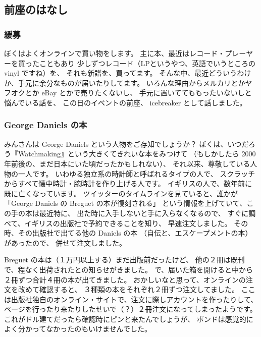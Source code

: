 \documentclass[dvipdfmx,autodetect-engine,10pt,b5paper,papersize,openany,dvipsnames]{jsbook}
\begin{document}
\begin{multicols}{2}
\subsection*{前座のはなし}

\subsubsection*{緩募}
ぼくはよくオンラインで買い物をします。
主に本、最近はレコード・プレーヤーを買ったこともあり
少しずつレコード（LPというやつ、英語でいうところの vinyl ですね）を、
それも新譜を、買ってます。
そんな中、最近どういうわけか、手元に余分なものが届いたりしてます。
いろんな理由からメルカリとかヤフオクとか eBay とかで売りたくないし、
手元に置いててももったいないしと悩んでいる話を、
この日のイベントの前座、 icebreaker として話しました。

\subsubsection*{George Daniels の本}

みんさんは George Daniels という人物をご存知でしょうか？
ぼくは、いつだろう『Watchmaking』という大きくてきれいな本をみつけて
（もしかしたら 2000年前後の、まだ日本にいた頃だったかもしれない）、
それ以来、尊敬している人物の一人です。
いわゆる独立系の時計師と呼ばれるタイプの人で、
スクラッチからすべて懐中時計・腕時計を作り上げる人です。
イギリスの人で、数年前に既に亡くなっています。
ツイッターのタイムラインを見ていると、誰かが
「George Daniels の Breguet の本が復刻される」
という情報を上げていて、この手の本は最近特に、
出た時に入手しないと手に入らなくなるので、
すぐに調べて、イギリスの出版社で予約できることを知り、
早速注文しました。
その時、その出版社で出てる他の Daniels の本
（自伝と、エスケープメントの本）があったので、
併せて注文しました。

Breguet の本は（１万円以上する）まだ出版前だったけど、
他の２冊は既刊で、程なく出荷されたとの知らせがきました。
で、届いた箱を開けると中から２冊ずつ合計４冊の本が出てきました。
おかしいなと思って、オンラインの注文を改めて確認すると、
３種類の本をそれぞれ２冊ずつ注文してました。
ここは出版社独自のオンライン・サイトで、注文に際しアカウントを作ったりして、
ページを行ったり来たりしたせいで（？）２冊注文になってしまったようです。
これがドル建てだったら確認時にピンと来たんでしょうが、
ポンドは感覚的によく分かってなかったのもいけませんでした。


\end{multicols}
\end{document}
